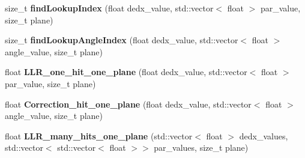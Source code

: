 \begin{DoxyCompactItemize}
\item 
size\+\_\+t {\bfseries find\+Lookup\+Index} (float dedx\+\_\+value, std\+::vector$<$ float $>$ par\+\_\+value, size\+\_\+t plane)\hypertarget{classsearchingfornues_1_1LLRPID_a891182e0af5e60e975e86ea5d2973e11}{}\label{classsearchingfornues_1_1LLRPID_a891182e0af5e60e975e86ea5d2973e11}

\item 
size\+\_\+t {\bfseries find\+Lookup\+Angle\+Index} (float dedx\+\_\+value, std\+::vector$<$ float $>$ angle\+\_\+value, size\+\_\+t plane)\hypertarget{classsearchingfornues_1_1LLRPID_ad85ee79b59b2eb15b28ffcadb2618510}{}\label{classsearchingfornues_1_1LLRPID_ad85ee79b59b2eb15b28ffcadb2618510}

\item 
float {\bfseries L\+L\+R\+\_\+one\+\_\+hit\+\_\+one\+\_\+plane} (float dedx\+\_\+value, std\+::vector$<$ float $>$ par\+\_\+value, size\+\_\+t plane)\hypertarget{classsearchingfornues_1_1LLRPID_a615612fe3657b51e18bf1e514399363a}{}\label{classsearchingfornues_1_1LLRPID_a615612fe3657b51e18bf1e514399363a}

\item 
float {\bfseries Correction\+\_\+hit\+\_\+one\+\_\+plane} (float dedx\+\_\+value, std\+::vector$<$ float $>$ angle\+\_\+value, size\+\_\+t plane)\hypertarget{classsearchingfornues_1_1LLRPID_a1b7e9cd794dd86cbe175830986716a11}{}\label{classsearchingfornues_1_1LLRPID_a1b7e9cd794dd86cbe175830986716a11}

\item 
float {\bfseries L\+L\+R\+\_\+many\+\_\+hits\+\_\+one\+\_\+plane} (std\+::vector$<$ float $>$ dedx\+\_\+values, std\+::vector$<$ std\+::vector$<$ float $>$$>$ par\+\_\+values, size\+\_\+t plane)\hypertarget{classsearchingfornues_1_1LLRPID_ac8090da570daccff827fa96685b54f1e}{}\label{classsearchingfornues_1_1LLRPID_ac8090da570daccff827fa96685b54f1e}

\end{DoxyCompactItemize}
